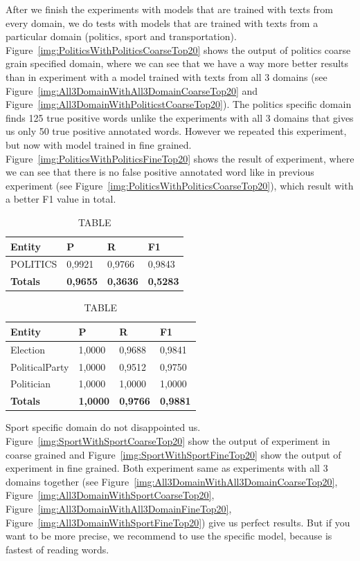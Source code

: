 \documentclass[thesis=M,english]{FITthesis}[2018/05/30]
\begin{document}
	After we finish the experiments with models that are trained with texts from every domain, we do tests with models that are trained with texts from a particular domain (politics, sport and transportation).
	Figure~\ref{img:PoliticsWithPoliticsCoarseTop20} shows the output of politics coarse grain specified domain, where we can see that we have a way more better results than in experiment with a model trained with texts from all 3 domains (see Figure~\ref{img:All3DomainWithAll3DomainCoarseTop20} and Figure~\ref{img:All3DomainWithPoliticstCoarseTop20}). The politics specific domain finds 125 true positive words unlike the experiments with all 3 domains that gives us only 50 true positive annotated words. However we repeated this experiment, but now with model trained in fine grained. Figure~\ref{img:PoliticsWithPoliticsFineTop20} shows the result of experiment, where we can see that there is no false positive annotated word like in previous experiment (see Figure~\ref{img:PoliticsWithPoliticsCoarseTop20}), which result with a better F1 value in total.  
	
	\begin{table}[H]\centering
		\caption{TABLE}
		\label{}
		\begin{tabular}{|l|l|l|l|}
			\hline {\textbf{Entity}} & {\textbf{P}} & {\textbf{R}} & {\textbf{F1}}\\\hline
				POLITICS & 0,9921 & 0,9766 & 0,9843\\\hline
				\textbf{Totals} & \textbf{0,9655} & \textbf{0,3636} & \textbf{0,5283}\\\hline
		\end{tabular}
	\end{table}	
	
	\begin{table}[H]\centering
		\caption{TABLE}
		\label{}
		\begin{tabular}{|l|l|l|l|}
			\hline {\textbf{Entity}} & {\textbf{P}} & {\textbf{R}} & {\textbf{F1}}\\\hline
				Election & 1,0000 & 0,9688 & 0,9841\\
				PoliticalParty & 1,0000 & 0,9512 & 0,9750\\
				Politician & 1,0000 & 1,0000 & 1,0000\\\hline
				\textbf{Totals} & \textbf{1,0000} & \textbf{0,9766} & \textbf{0,9881}\\\hline
		\end{tabular}
	\end{table}
	
	Sport specific domain do not disappointed us. Figure~\ref{img:SportWithSportCoarseTop20} show the output of experiment in coarse grained and Figure~\ref{img:SportWithSportFineTop20} show the output of experiment in fine grained. Both experiment same as experiments with all 3 domains together (see Figure~\ref{img:All3DomainWithAll3DomainCoarseTop20}, Figure~\ref{img:All3DomainWithSportCoarseTop20}, Figure~\ref{img:All3DomainWithAll3DomainFineTop20}, Figure~\ref{img:All3DomainWithSportFineTop20}) give us perfect results. But if you want to be more precise, we recommend to use the specific model, because is fastest of reading words.  
	
\end{document}
